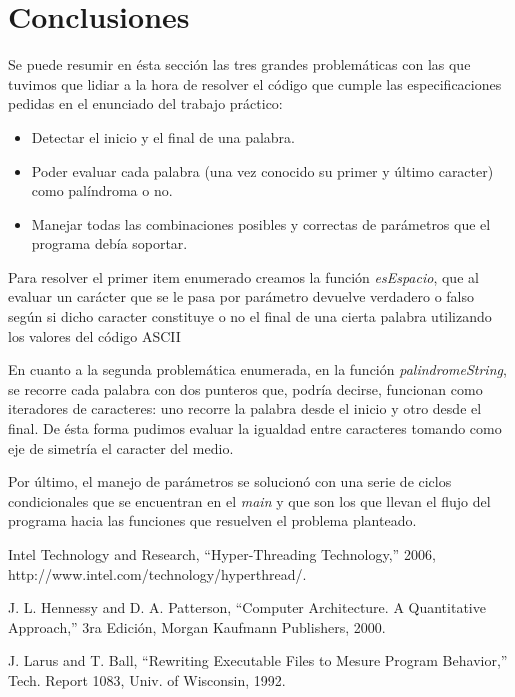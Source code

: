 \documentclass[a4paper,10pt]{article}
\begin{document}
\section{Conclusiones}

Se puede resumir en ésta sección las tres grandes problemáticas con las que tuvimos que lidiar a la hora de resolver el código que cumple las especificaciones pedidas en el enunciado del trabajo práctico:

\begin{itemize}
\item Detectar el inicio y el final de una palabra.

\item Poder evaluar cada palabra (una vez conocido su primer y último caracter) como palíndroma o no.

\item Manejar todas las combinaciones posibles y correctas de parámetros que el programa debía soportar.
\end{itemize}

	Para resolver el primer item enumerado creamos la función \textit{esEspacio}, que al evaluar un carácter que se le pasa por parámetro devuelve verdadero o falso según si dicho caracter constituye o no el final de una cierta palabra utilizando los valores del código ASCII

\indent	
	En cuanto a la segunda problemática enumerada, en la función \textit{palindromeString}, se recorre cada palabra con dos punteros que, podría decirse, funcionan como iteradores de caracteres: uno recorre la palabra desde el inicio y otro desde el final. De ésta forma pudimos evaluar la igualdad entre caracteres tomando como eje de simetría el caracter del medio.

\indent	
	Por último, el manejo de parámetros se solucionó con una serie de ciclos condicionales que se encuentran en el \textit{main} y que son los que llevan el flujo del programa hacia las funciones que resuelven el problema planteado.

\begin{thebibliography}{99}

 Intel Technology and Research, ``Hyper-Threading Technology,'' 2006, http://www.intel.com/technology/hyperthread/.

 J. L. Hennessy and D. A. Patterson, ``Computer Architecture. A Quantitative
Approach,'' 3ra Edición, Morgan Kaufmann Publishers, 2000.

 J. Larus and T. Ball, ``Rewriting Executable Files to Mesure Program Behavior,'' Tech. Report 1083, Univ. of Wisconsin, 1992.

\end{thebibliography}
\end{document}
